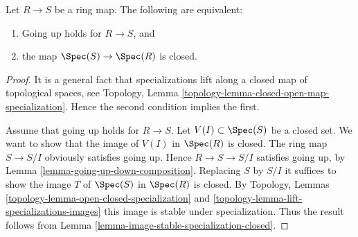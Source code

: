 \begin{lemma}
\label{lemma-going-up-closed}
Let $R \to S$ be a ring map. The following are equivalent:
\begin{enumerate}
\item Going up holds for $R \to S$, and
\item the map $\Spec(S) \to \Spec(R)$ is closed.
\end{enumerate}
\end{lemma}

\begin{proof}
It is a general fact that specializations lift along a
closed map of topological spaces, see
Topology, Lemma \ref{topology-lemma-closed-open-map-specialization}.
Hence the second condition implies the first.

\medskip\noindent
Assume that going up holds for $R \to S$.
Let $V(I) \subset \Spec(S)$ be a closed set.
We want to show that the image of $V(I)$ in $\Spec(R)$ is closed.
The ring map $S \to S/I$ obviously satisfies going up.
Hence $R \to S \to S/I$ satisfies going up,
by Lemma \ref{lemma-going-up-down-composition}.
Replacing $S$ by $S/I$ it suffices to show the image $T$
of $\Spec(S)$ in $\Spec(R)$ is closed.
By Topology, Lemmas \ref{topology-lemma-open-closed-specialization}
and \ref{topology-lemma-lift-specializations-images} this
image is stable under specialization. Thus the result follows
from Lemma \ref{lemma-image-stable-specialization-closed}.
\end{proof}